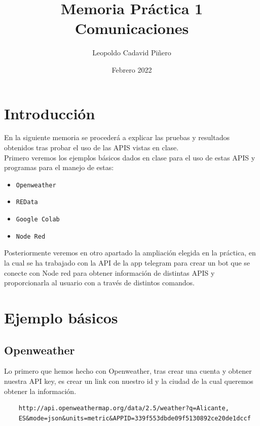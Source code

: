 \documentclass[12pt]{article}
\title{Memoria Práctica 1 \\


\large Comunicaciones
}
\author{
Leopoldo Cadavid Piñero
}
\date{Febrero 2022}
\begin{document}
\maketitle
\tableofcontents

\section{Introducción}

      En la siguiente memoria se procederá a explicar las pruebas y resultados obtenidos tras probar el uso de 
      las APIS vistas en clase.
      \\

      Primero veremos los ejemplos básicos dados en clase para el uso de estas APIS y programas para el manejo de estas:

      \begin{itemize}
        \item \verb|Openweather| 
        \item \verb|REData | 
        \item \verb|Google Colab| 
        \item \verb|Node Red| 
        
    
        
    
        
    \end{itemize}

      Posteriormente veremos en otro apartado la ampliación elegida en la práctica, en la cual se ha 
      trabajado con la API de la app telegram para crear un bot que se conecte con Node red para obtener información de distintas APIS y proporcionarla
      al usuario con a través de distintos comandos.
      

\section{Ejemplo básicos}

\subsection{Openweather}

Lo primero que hemos hecho con Openweather, tras crear una cuenta y obtener nuestra API key, es crear un link  con nuestro id y la 
ciudad de la cual queremos obtener la información.\\

\begin{verbatim}
    http://api.openweathermap.org/data/2.5/weather?q=Alicante,
    ES&mode=json&units=metric&APPID=339f553dbde09f5130892ce20de1dccf
\end{verbatim}
    
\end{document}

